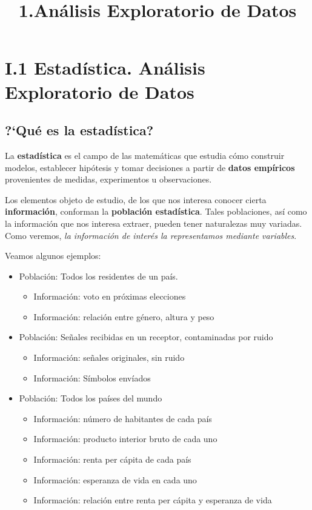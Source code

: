 \documentclass[11pt]{article}
\title{1.Análisis Exploratorio de Datos}
\begin{document}
    
    
    \maketitle
    
    

    
    \section*{I.1 Estadística. Análisis Exploratorio de
Datos}\label{i.1-estaduxedstica.-anuxe1lisis-exploratorio-de-datos}

    \subsection*{?`Qué es la estadística?}\label{quuxe9-es-la-estaduxedstica}

La \textbf{estadística} es el campo de las matemáticas que estudia cómo
construir modelos, establecer hipótesis y tomar decisiones a partir de
\textbf{datos empíricos} provenientes de medidas, experimentos u
observaciones.

Los elementos objeto de estudio, de los que nos interesa conocer cierta
\textbf{información}, conforman la \textbf{población estadística}. Tales
poblaciones, así como la información que nos interesa extraer, pueden
tener naturalezas muy variadas. Como veremos, \emph{la información de
interés la representamos mediante variables}.

    Veamos algunos ejemplos: 
 \begin{itemize}   
\item Población: Todos los residentes de un país.
\begin{itemize}
\item Información: voto en próximas elecciones 
\item Información: relación entre género, altura y peso 
\end{itemize}
\item Población: Señales recibidas en un receptor, contaminadas por ruido 
\begin{itemize}
\item Información: señales originales, sin ruido 
\item Información: Símbolos envíados 
\end{itemize}
\item Población: Todos los países del mundo 
\begin{itemize}
\item Información: número de habitantes de cada país 
\item Información: producto interior bruto de cada uno 
\item Información: renta per cápita de cada país
\item Información: esperanza de vida en cada uno 
\item Información: relación entre renta per cápita y esperanza de vida
\end{itemize}
\end{itemize}
\end{document}
